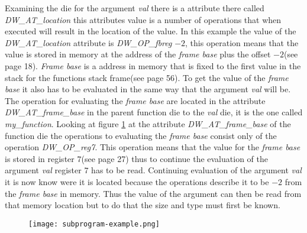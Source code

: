 Examining the \gls{die} for the argument \emph{val} there is a attribute there called \emph{DW\_AT\_location} this attributes value is a number of operations that when executed will result in the location of the value.
In this example the value of the \emph{DW\_AT\_location} attribute is \emph{DW\_OP\_fbreg} $-2$, this operation means that the value is stored in memory at the address of the \emph{frame base} plus the offset $-2$(see \cite{dwarf} page 18).
\emph{Frame base} is a address in memory that is fixed to the first value in the stack for the functions stack frame(see \cite{dwarf} page 56).
To get the value of the \emph{frame base} it also has to be evaluated in the same way that the argument \emph{val} will be.
The operation for evaluating the \emph{frame base} are located in the attribute \emph{DW\_AT\_frame\_base} in the parent function \gls{die} to the \emph{val} die, it is the one called \emph{my\_function}.
Looking at figure \ref{fig:subprogramexample} at the attribute \emph{DW\_AT\_frame\_base} of the function \gls{die} the operations to evaluating the \emph{frame base} consist only of the operation \emph{DW\_OP\_reg7}.
This operation means that the value for the \emph{frame base} is stored in register $7$(see \cite{dwarf} page 27) thus to continue the evaluation of the argument \emph{val} register $7$ has to be read.
Continuing evaluation of the argument \emph{val} it is now know were it is located because the operations describe it to be $-2$ from the \emph{frame base} in memory.
Thus the value of the argument can then be read from that memory location but to do that the size and type must first be known.


\begin{figure}[h]
    \centering
    \texttt{[image: subprogram-example.png]}
    \label{fig:subprogramexample}
\end{figure}


